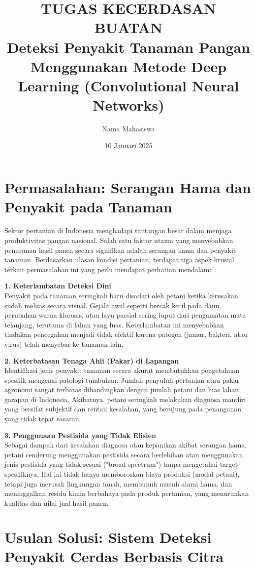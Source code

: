 \documentclass[a4paper,12pt]{article}
\title{\textbf{TUGAS KECERDASAN BUATAN}\\Deteksi Penyakit Tanaman Pangan Menggunakan Metode Deep Learning (Convolutional Neural Networks)}
\author{Nama Mahasiswa}
\date{10 Januari 2025}
\begin{document}
\maketitle

\section{Permasalahan: Serangan Hama dan Penyakit pada Tanaman}

Sektor pertanian di Indonesia menghadapi tantangan besar dalam menjaga produktivitas pangan nasional. Salah satu faktor utama yang menyebabkan penurunan hasil panen secara signifikan adalah serangan hama dan penyakit tanaman. Berdasarkan ulasan kondisi pertanian, terdapat tiga aspek krusial terkait permasalahan ini yang perlu mendapat perhatian mendalam:

\textbf{1. Keterlambatan Deteksi Dini} \\
Penyakit pada tanaman seringkali baru disadari oleh petani ketika kerusakan sudah meluas secara visual. Gejala awal seperti bercak kecil pada daun, perubahan warna klorosis, atau layu parsial sering luput dari pengamatan mata telanjang, terutama di lahan yang luas. Keterlambatan ini menyebabkan tindakan pencegahan menjadi tidak efektif karena patogen (jamur, bakteri, atau virus) telah menyebar ke tanaman lain.

\textbf{2. Keterbatasan Tenaga Ahli (Pakar) di Lapangan} \\
Identifikasi jenis penyakit tanaman secara akurat membutuhkan pengetahuan spesifik mengenai patologi tumbuhan. Jumlah penyuluh pertanian atau pakar agronomi sangat terbatas dibandingkan dengan jumlah petani dan luas lahan garapan di Indonesia. Akibatnya, petani seringkali melakukan diagnosa mandiri yang bersifat subjektif dan rentan kesalahan, yang berujung pada penanganan yang tidak tepat sasaran.

\textbf{3. Penggunaan Pestisida yang Tidak Efisien} \\
Sebagai dampak dari kesalahan diagnosa atau kepanikan akibat serangan hama, petani cenderung menggunakan pestisida secara berlebihan atau menggunakan jenis pestisida yang tidak sesuai ("broad-spectrum") tanpa mengetahui target spesifiknya. Hal ini tidak hanya memboroskan biaya produksi (modal petani), tetapi juga merusak lingkungan tanah, membunuh musuh alami hama, dan meninggalkan residu kimia berbahaya pada produk pertanian, yang menurunkan kualitas dan nilai jual hasil panen.

\section{Usulan Solusi: Sistem Deteksi Penyakit Cerdas Berbasis Citra}
\end{document}
